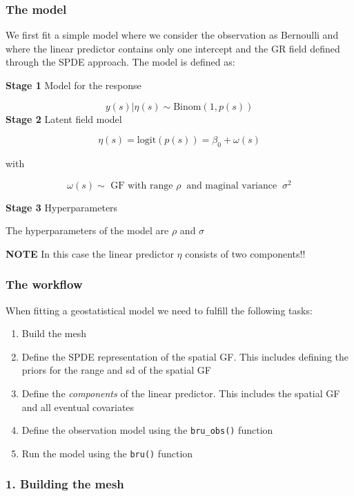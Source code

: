 \documentclass[
  letterpaper,
  DIV=11,
  numbers=noendperiod]{scrartcl}
\begin{document}
\subsubsection{The model}\label{the-model-1}

We first fit a simple model where we consider the observation as
Bernoulli and where the linear predictor contains only one intercept and
the GR field defined through the SPDE approach. The model is defined as:

\textbf{Stage 1} Model for the response

\[
y(s)|\eta(s)\sim\text{Binom}(1, p(s))
\] \textbf{Stage 2} Latent field model

\[
\eta(s) = \text{logit}(p(s)) = \beta_0 + \omega(s)
\]

with

\[
\omega(s)\sim \text{  GF with range } \rho\  \text{ and maginal variance }\ \sigma^2
\]

\textbf{Stage 3} Hyperparameters

The hyperparameters of the model are \(\rho\) and \(\sigma\)

\textbf{NOTE} In this case the linear predictor \(\eta\) consists of two
components!!

\subsubsection{The workflow}\label{the-workflow}

When fitting a geostatistical model we need to fulfill the following
tasks:

\begin{enumerate}
\def\labelenumi{\arabic{enumi}.}
\item
  Build the mesh
\item
  Define the SPDE representation of the spatial GF. This includes
  defining the priors for the range and sd of the spatial GF
\item
  Define the \emph{components} of the linear predictor. This includes
  the spatial GF and all eventual covariates
\item
  Define the observation model using the \texttt{bru\_obs()} function
\item
  Run the model using the \texttt{bru()} function
\end{enumerate}

\subsubsection{1. Building the mesh}\label{building-the-mesh}
\end{document}
